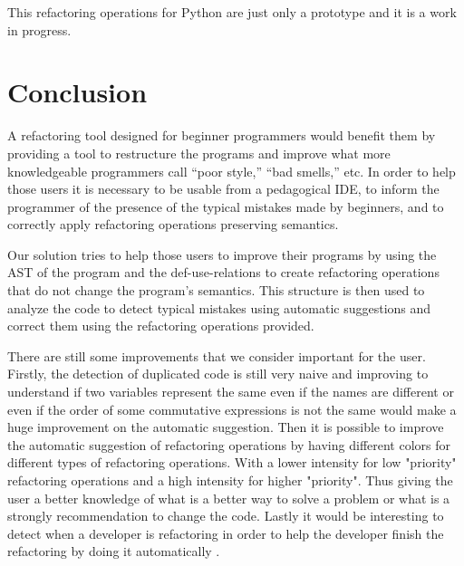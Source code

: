 This refactoring operations for Python are just only a prototype and it is a work
in progress.
\section{Conclusion}
A refactoring tool designed for beginner programmers would benefit them
by providing a tool to restructure the programs and improve what more knowledgeable programmers call ``poor style,''
``bad smells,'' etc.
In order to help those users it is necessary to be usable from a pedagogical IDE,
to inform the programmer of the presence of the typical mistakes made by beginners, and
to correctly apply refactoring operations preserving semantics.

Our solution tries to help those users to improve their programs by using the AST of
the program and the def-use-relations to create refactoring operations that do not
change the program's semantics. This structure is then used to analyze the code
to detect typical mistakes using automatic suggestions and correct them using the
refactoring operations provided.


There are still some improvements that we consider important for the user.
Firstly, the detection of duplicated code is still very naive and improving to understand if
two variables represent the same even if the names are different or even if the
 order of some commutative expressions is not the same would make a huge improvement
 on the automatic suggestion.
Then it is possible to improve the automatic suggestion of refactoring operations by
having different colors for different types of refactoring operations.
With a lower intensity for low "priority" refactoring operations and a high intensity
for higher "priority". Thus giving the user a better knowledge of what is a better
way to solve a problem or what is a strongly recommendation to change the code.
Lastly it would be interesting to detect when a developer is refactoring in order to help the developer finish the
refactoring by doing it automatically \cite{ge2012reconciling}.
